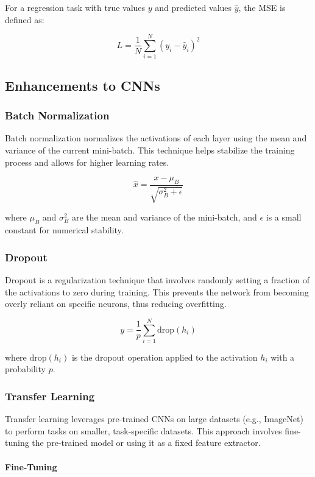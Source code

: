 \documentclass[12pt]{article}
\begin{document}
For a regression task with true values \( y \) and predicted values \( \hat{y} \), the MSE is defined as:

\[
L = \frac{1}{N} \sum_{i=1}^{N} (y_i - \hat{y}_i)^2
\]

\subsection{Enhancements to CNNs}

\subsubsection{Batch Normalization}

Batch normalization normalizes the activations of each layer using the mean and variance of the current mini-batch. This technique helps stabilize the training process and allows for higher learning rates.

\[
\hat{x} = \frac{x - \mu_B}{\sqrt{\sigma_B^2 + \epsilon}}
\]

where \( \mu_B \) and \( \sigma_B^2 \) are the mean and variance of the mini-batch, and \( \epsilon \) is a small constant for numerical stability.

\subsubsection{Dropout}

Dropout is a regularization technique that involves randomly setting a fraction of the activations to zero during training. This prevents the network from becoming overly reliant on specific neurons, thus reducing overfitting.

\[
y = \frac{1}{p} \sum_{i=1}^{N} \text{drop}(h_i)
\]

where \( \text{drop}(h_i) \) is the dropout operation applied to the activation \( h_i \) with a probability \( p \).

\subsubsection{Transfer Learning}

Transfer learning leverages pre-trained CNNs on large datasets (e.g., ImageNet) to perform tasks on smaller, task-specific datasets. This approach involves fine-tuning the pre-trained model or using it as a fixed feature extractor.

\paragraph{Fine-Tuning}
\end{document}
